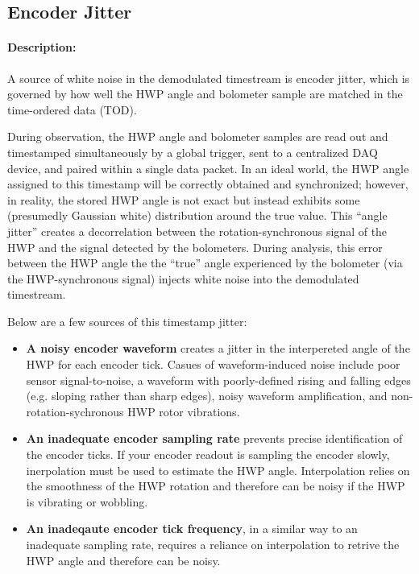\subsection{Encoder Jitter}

\paragraph{Description:} 

A source of white noise in the demodulated timestream is encoder jitter, which is governed by how well the HWP angle and bolometer sample are matched in the time-ordered data (TOD). 

During observation, the HWP angle and bolometer samples are read out and timestamped simultaneously by a global trigger, sent to a centralized DAQ device, and paired within a single data packet. In an ideal world, the HWP angle assigned to this timestamp will be correctly obtained and synchronized; however, in reality, the stored HWP angle is not exact but instead exhibits some (presumedly Gaussian white) distribution around the true value. This ``angle jitter'' creates a decorrelation between the rotation-synchronous signal of the HWP and the signal detected by the bolometers. During analysis, this error between the HWP angle the the ``true'' angle experienced by the bolometer (via the HWP-synchronous signal) injects white noise into the demodulated timestream.

Below are a few sources of this timestamp jitter:

\begin{itemize}
 \item \textbf{A noisy encoder waveform} creates a jitter in the interpereted angle of the HWP for each encoder tick. Casues of waveform-induced noise include poor sensor signal-to-noise, a waveform with poorly-defined rising and falling edges (e.g. sloping rather than sharp edges), noisy waveform amplification, and non-rotation-sychronous HWP rotor vibrations.
 \item \textbf{An inadequate encoder sampling rate} prevents precise identification of the encoder ticks. If your encoder readout is sampling the encoder slowly, inerpolation must be used to estimate the HWP angle. Interpolation relies on the smoothness of the HWP rotation and therefore can be noisy if the HWP is vibrating or wobbling.
 \item \textbf{An inadeqaute encoder tick frequency}, in a similar way to an inadequate sampling rate, requires a reliance on interpolation to retrive the HWP angle and therefore can be noisy.
 \end{itemize}
  
